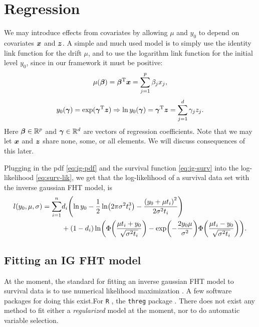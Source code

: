 \section{Regression}\label{subsec:IG-reg}
We may introduce effects from covariates by allowing $\mu$ and $y_0$ to depend on covariates $\bm{x}$ and $\bm{z}$.
A simple and much used model \citep{leewhitmore2006, caroni2017} is to simply use the identity link function for the drift $\mu$, and to use the logarithm link function for the initial level $y_0$, since in our framework it must be positive:
\begin{equation}\label{eq:y0}
    \mu(\boldsymbol{\beta})=\boldsymbol{\beta}^{\text{T}}\bm{x}=\sum_{j=1}^p \beta_jx_j,
\end{equation}
\begin{equation}\label{eq:mu}
    y_0(\boldsymbol{\gamma})=\exp(\boldsymbol{\gamma}^{\text{T}}\bm{z})\Rightarrow\ln y_0(\boldsymbol{\gamma})=\boldsymbol{\gamma}^{\text{T}}\bm{z}=\sum_{j=1}^d \gamma_jz_j.
\end{equation}
Here $\boldsymbol{\beta}\in\mathbb{R}^p$ and $\boldsymbol{\gamma}\in\mathbb{R}^d$ are vectors of regression coefficients. Note that we may let $\bm{x}$ and $\bm{z}$ share none, some, or all elements. We will discuss consequences of this later.

Plugging in the pdf \eqref{eq:ig-pdf} and the survival function \eqref{eq:ig-surv} into the log-likelihood \eqref{eq:surv-lik}, we get that the log-likelihood of a survival data set with the inverse gaussian FHT model, is
\begin{align}\label{eq:loglik}
\begin{split}
    l(y_0,\mu,\sigma)=\sum_{i=1}^n&d_i\p*{\ln y_0-\frac{1}{2}\ln\p*{2\pi\sigma^2\ti^3}-\frac{\p*{y_0+\mu\ti}^2}{2\sigma^2\ti}} \\
    &+
    (1-d_i)\ln\p*{\Phi\p*{\frac{\mu\ti+y_0}{\sqrt{\sigma^2\ti}}}-\exp\p*{-\frac{2y_0\mu}{\sigma^2}}\Phi\p*{\frac{\mu\ti-y_0}{\sqrt{\sigma^2\ti}}}}.
\end{split}
\end{align}

\subsection{Fitting an IG FHT model}
At the moment, the standard for fitting an inverse gaussian FHT model to survival data is to use numerical likelihood maximization \citep{caroni2017}. A few software packages for doing this exist.For \verb|R| \citep{Rlang}, the \verb|threg| package \citep{threg}.
There does not exist any method to fit either a \textit{regularized} model at the moment, nor to do automatic variable selection.

